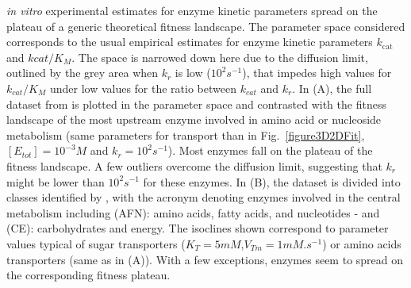 \documentclass[11pt,onecolumn]{article}
\providecommand{\DIFdel}[1]{{\protect\color{red} \scriptsize #1}} %
\providecommand{\DIFdelFL}[1]{\DIFdel{#1}} %
\begin{document}
\DIFdelFL{\hspace{-0.3cm}
}%
{%
\DIFdelFL{\textit{in vitro} experimental estimates for enzyme kinetic parameters spread on the plateau of a generic theoretical fitness landscape. The parameter space considered corresponds to the usual empirical estimates for enzyme kinetic parameters $k_\text{cat}$ and $k{cat}/K_M$. The space is narrowed down here due to the diffusion limit, outlined by the grey area when $k_r$ is low ($10^2s^{-1}$), that impedes high values for $k_{cat}/K_M$ under low values for the ratio between $k_{cat}$ and $k_r$. In (A), the full dataset from \citep{Bar-Even11} is plotted in the parameter space and contrasted with the fitness landscape of the most upstream enzyme involved in amino acid or nucleoside metabolism (same parameters for transport than in Fig.~\ref{figure3D2DFit}, $[E_{tot}]=10^{-3}M$ and $k_r=10^{2}s^{-1}$). Most enzymes fall on the plateau of the fitness landscape. A few outliers overcome the diffusion limit, suggesting that $k_r$ might be lower than $10^2s^{-1}$ for these enzymes. In (B), the dataset is divided into classes identified by \citet{Bar-Even11}, with the acronym denoting enzymes involved in the central metabolism including (AFN): amino acids, fatty acids, and nucleotides  - and (CE): carbohydrates and energy. The isoclines shown correspond to parameter values typical of sugar transporters ($K_T=5mM$,$V_{Tm}=1mM.s^{-1}$) \citep{Maier02} or amino acids transporters (same as in (A)). With a few exceptions, enzymes seem to spread on the corresponding fitness plateau.}}
\end{document}
